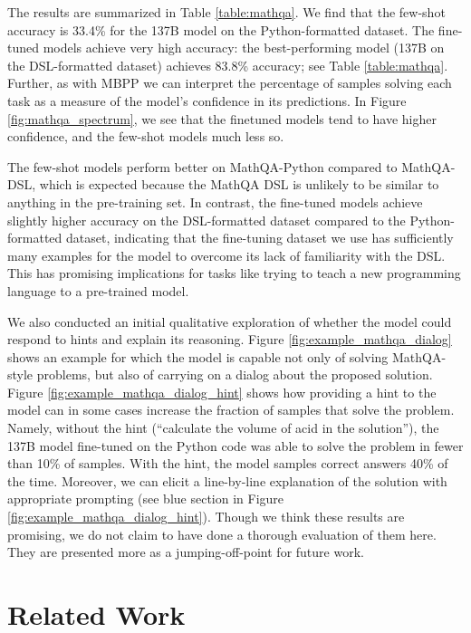 The results are summarized in Table \ref{table:mathqa}.
We find that the few-shot accuracy is 33.4\% for the 137B model on the Python-formatted dataset. The fine-tuned models achieve very high accuracy: the best-performing model (137B on the DSL-formatted dataset) achieves 83.8\% accuracy; see Table \ref{table:mathqa}.
Further, as with MBPP we can interpret the percentage of samples solving each task as a measure of the model's confidence in its predictions. In Figure \ref{fig:mathqa_spectrum},
we see that the finetuned models tend to have higher confidence, and the few-shot models much less so.

The few-shot models perform better on MathQA-Python compared to MathQA-DSL, which is expected because the MathQA DSL is unlikely to be similar to anything in the pre-training set. In contrast, the fine-tuned models achieve slightly higher accuracy on the DSL-formatted dataset compared to the Python-formatted dataset, indicating that the fine-tuning dataset we use has sufficiently many examples for the model to overcome its lack of familiarity with the DSL. This has promising implications for tasks like trying to teach a new programming language to a pre-trained model.

We also conducted an initial qualitative exploration of whether the model could respond to hints and explain its reasoning. Figure \ref{fig:example_mathqa_dialog}
shows an example for which the model is capable not only of solving MathQA-style problems, but also of carrying on a dialog about the proposed solution. Figure \ref{fig:example_mathqa_dialog_hint} shows how providing a hint to the model can in some cases increase the fraction of samples that solve the problem. Namely, without the hint (``calculate the volume of acid in the solution''), the 137B model fine-tuned on the Python code was able to solve the problem in fewer than 10\% of samples. With the hint, the model samples correct answers 40\% of the time. Moreover, we can elicit a line-by-line explanation of the solution with appropriate prompting (see blue section in Figure \ref{fig:example_mathqa_dialog_hint}).
Though we think these results are promising, we do not claim to have done a thorough evaluation of them here. They are presented more as a jumping-off-point for future work.

\FloatBarrier
\section{Related Work}
\label{sec:related}

